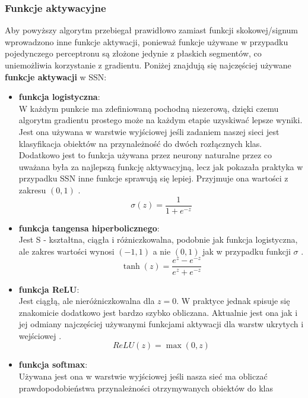 \documentclass{article}
\begin{document}
\subsubsection{Funkcje aktywacyjne}
\label{sec:fa}
Aby powyższy algorytm przebiegał prawidłowo zamiast funkcji skokowej/signum wprowadzono inne 
funkcje aktywacji, ponieważ funkcje używane w przypadku pojedynczego perceptronu są złożone
jedynie z płaskich segmentów, co uniemożliwia korzystanie z gradientu. Poniżej znajdują się 
najczęściej używane \textbf{funkcje aktywacji} w SSN:
\begin{itemize}
\item \textbf{funkcja logistyczna}:\\
W każdym punkcie ma zdefiniowaną pochodną niezerową, dzięki czemu algorytm gradientu prostego
może na każdym etapie uzyskiwać lepsze wyniki. Jest ona używana w warstwie wyjściowej jeśli
zadaniem naszej sieci jest klasyfikacja obiektów na przynależność do dwóch rozłącznych klas.
Dodatkowo jest to funkcja używana przez neurony 
naturalne przez co uważana była za najlepszą funkcję aktywacyjną, lecz jak pokazała praktyka
w przypadku SSN inne funkcje sprawują się lepiej. Przyjmuje ona wartości z zakresu $(0,1)$
\cite{um}.
\begin{equation}
\sigma(z) = \frac{1}{1 + e^{-z}}
\end{equation}
\item \textbf{funkcja tangensa hiperbolicznego}:\\
Jest S - kształtna, ciągła i różniczkowalna, podobnie jak funkcja logistyczna, 
ale zakres wartości wynosi $(-1, 1)$ a nie $(0, 1)$ jak w przypadku funkcji 
$\sigma$ \cite{um}.
\begin{equation}
	\tanh(z) = \frac{e^z - e^{-z}}{e^z + e^{-z}}
\end{equation}
\item \textbf{funkcja ReLU}:\\
Jest ciągłą, ale nieróżniczkowalna dla $z = 0$. W praktyce jednak spisuje się znakomicie 
dodatkowo jest bardzo szybko obliczana. Aktualnie jest ona jak i jej odmiany najczęściej
używanymi funkcjami aktywacji dla warstw ukrytych i wejściowej \cite{um}. 
\begin{equation}
	ReLU(z) = \max(0, z)
\end{equation}
\item \textbf{funkcja softmax}:\\
Używana jest ona w warstwie wyjściowej jeśli nasza sieć ma obliczać
prawdopodobieństwa przynależności otrzymywanych obiektów  do klas 

\end{itemize}
\end{document}
